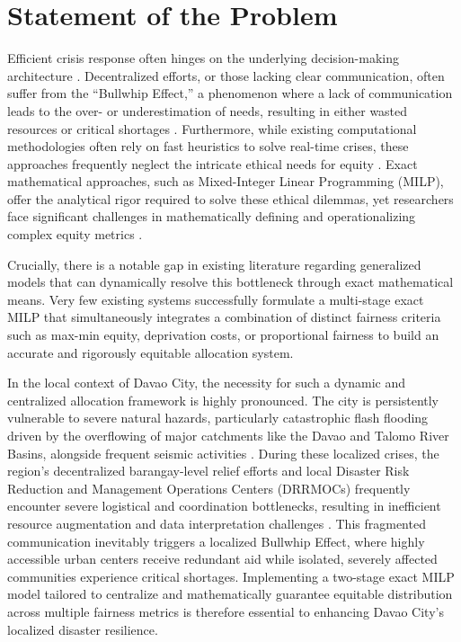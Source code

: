 \section{Statement of the Problem}
Efficient crisis response often hinges on the underlying decision-making architecture \cite{balcik2010}. Decentralized efforts, or those lacking clear communication, often suffer from the ``Bullwhip Effect,'' a phenomenon where a lack of communication leads to the over- or underestimation of needs, resulting in either wasted resources or critical shortages \cite{balcik2010}. Furthermore, while existing computational methodologies often rely on fast heuristics to solve real-time crises, these approaches frequently neglect the intricate ethical needs for equity \cite{wang2018}. Exact mathematical approaches, such as Mixed-Integer Linear Programming (MILP), offer the analytical rigor required to solve these ethical dilemmas, yet researchers face significant challenges in mathematically defining and operationalizing complex equity metrics \cite{ni2015}.

Crucially, there is a notable gap in existing literature regarding generalized models that can dynamically resolve this bottleneck through exact mathematical means. Very few existing systems successfully formulate a multi-stage exact MILP that simultaneously integrates a combination of distinct fairness criteria such as max-min equity, deprivation costs, or proportional fairness to build an accurate and rigorously equitable allocation system.

In the local context of Davao City, the necessity for such a dynamic and centralized allocation framework is highly pronounced. The city is persistently vulnerable to severe natural hazards, particularly catastrophic flash flooding driven by the overflowing of major catchments like the Davao and Talomo River Basins, alongside frequent seismic activities \cite{cayamanda2021}. During these localized crises, the region's decentralized barangay-level relief efforts and local Disaster Risk Reduction and Management Operations Centers (DRRMOCs) frequently encounter severe logistical and coordination bottlenecks, resulting in inefficient resource augmentation and data interpretation challenges \cite{samson2024}. This fragmented communication inevitably triggers a localized Bullwhip Effect, where highly accessible urban centers receive redundant aid while isolated, severely affected communities experience critical shortages. Implementing a two-stage exact MILP model tailored to centralize and mathematically guarantee equitable distribution across multiple fairness metrics is therefore essential to enhancing Davao City's localized disaster resilience.

